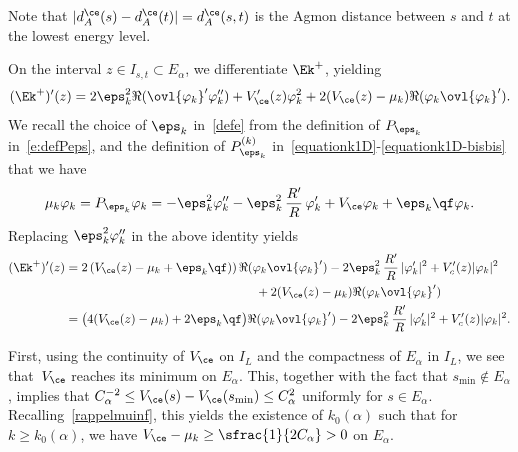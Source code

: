 Note that $|d_A^{\ce}(s)-d_A^{\ce}(t)| = d_A^{\ce}(s,t)$ is the Agmon distance between $s$ and $t$ at the lowest energy level.

On the interval $z \in I_{s,t}\subset E_\alpha$, we differentiate $\Ek^+$, yielding
\[
(\Ek^+)'(z)=2\eps_k^2\Re( \ovl{\varphi_k}' \varphi_k'')+ V_\ce'(z)\varphi_k^2 + 2(V_\ce(z)-\mu_k) \Re(\varphi_k \ovl{\varphi_k}' ).
\]
We recall the choice of $\eps_k$ in~\eqref{defe} from the definition of $P_{\eps_k}$ in~\eqref{e:defPeps}, and the definition of $P_{\eps_k}^{(k)}$ in~\eqref{equationk1D}-\eqref{equationk1D-bisbis} that we have
\[
\mu_k \varphi_k =P_{\eps_k} \varphi_k = - \eps_k^2 \varphi_k'' - \eps_k^2 \,\frac{R'}{R}\,\varphi_k' + V_\ce \varphi_k + \eps_k\qf \varphi_k.
\]
Replacing $\eps_k^2 \varphi_k''$ in the above identity yields
\begin{align}
\nonumber (\Ek^+)'(z)& =2 \left(V_\ce(z) -\mu_k + \eps_k\qf) \right) \Re(\varphi_k \ovl{\varphi_k}' )- 2\eps_k^2\, \frac{R'}{R}\,|\varphi_k'|^2+ V'_c(z)|\varphi_k|^2 \\
& \hspace*{5.42cm} + 2(V_{\ce}(z)-\mu_k) \Re(\varphi_k \ovl{\varphi_k}' ) \nonumber\\
\label{derivNRJ}& = \big(4(V_{\ce}(z)-\mu_k)+ 2 \eps_k\qf \big) \Re(\varphi_k \ovl{\varphi_k}' ) - 2\eps_k^2\, \frac{R'}{R}\,|\varphi_k'|^2+ V'_c(z)|\varphi_k|^2.
\end{align}

First, using the continuity of $V_{\ce}$ on $I_L$ and the compactness of $E_{\alpha}$ in $I_L$, we see that~$V_{\ce}$ reaches its minimum on $E_{\alpha}$. This, together with the fact that $ s_{\min}\notin E_{\alpha}$, implies that $C_{\alpha}^{-2}\leq V_{\ce}(s)-V_{\ce}(s_{\min})\leq C_{\alpha}^2$ uniformly for $s\in E_\alpha$. Recalling~\eqref{rappelmuinf}, this yields the existence of $k_0 (\alpha)$ such that for $k \geq k_0(\alpha)$, we have $V_{\ce}-\mu_k \geq \sfrac{1}{2C_\alpha}>0$ on $E_{\alpha}$.

